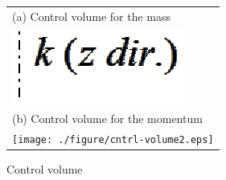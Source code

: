 \begin{figure}[t]
\begin{center}
  \begin{tabular}{l}
    (a) Control volume for the mass\\
  \includegraphics[scale=0.6]{./figure/cntrl-volume.eps}\\
    (b) Control volume for the momentum\\
  \texttt{[image: ./figure/cntrl-volume2.eps]}\\
  \end{tabular}
\end{center}
  \caption{Control volume}
  \label{fig:cntrl-volume}
\end{figure}
